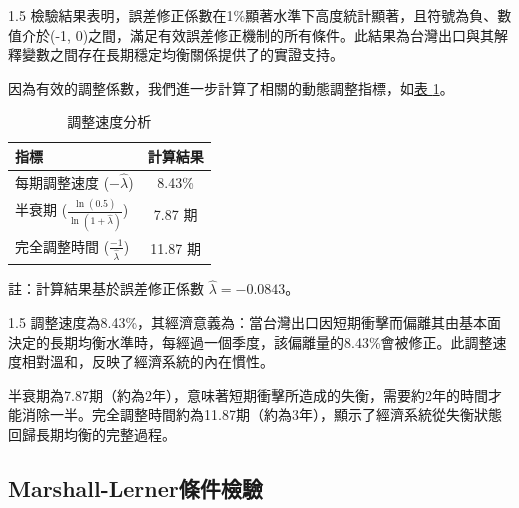 \documentclass[a4paper,12pt]{article}
\begin{document}
\begin{spacing}{1.5}
檢驗結果表明，誤差修正係數在1\%顯著水準下高度統計顯著，且符號為負、數值介於(-1, 0)之間，滿足有效誤差修正機制的所有條件。此結果為台灣出口與其解釋變數之間存在長期穩定均衡關係提供了的實證支持。
\end{spacing}

因為有效的調整係數，我們進一步計算了相關的動態調整指標，如\hspace{1pt}\hyperref[tab:adjustment_speed]{表 \ref{tab:adjustment_speed}}。
\begin{table}[h]
    \centering
    \begin{threeparttable}
        \caption{調整速度分析}
        \label{tab:adjustment_speed}
        \begin{tabular}{lc}
            \toprule
            指標 & 計算結果 \\
            \midrule
            每期調整速度 ($-\hat{\lambda}$) & 8.43\% \\
            半衰期 ($\frac{\ln(0.5)}{\ln(1+\hat{\lambda})}$) & 7.87 期 \\
            完全調整時間 ($\frac{-1}{\hat{\lambda}}$) & 11.87 期 \\
            \bottomrule
        \end{tabular}
        \begin{tablenotes}
            \footnotesize
            \item 註：計算結果基於誤差修正係數 $\hat{\lambda} = -0.0843$。
        \end{tablenotes}
    \end{threeparttable}
\end{table}
\begin{spacing}{1.5}
調整速度為8.43\%，其經濟意義為：當台灣出口因短期衝擊而偏離其由基本面決定的長期均衡水準時，每經過一個季度，該偏離量的8.43\%會被修正。此調整速度相對溫和，反映了經濟系統的內在慣性。

半衰期為7.87期（約為2年），意味著短期衝擊所造成的失衡，需要約2年的時間才能消除一半。完全調整時間約為11.87期（約為3年），顯示了經濟系統從失衡狀態回歸長期均衡的完整過程。
\end{spacing}

\vspace{-0.5cm}
\subsection{Marshall-Lerner條件檢驗}
\end{document}
